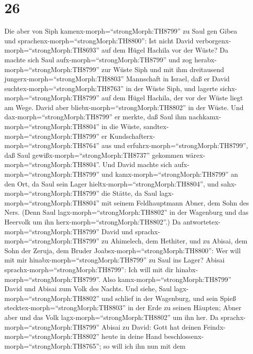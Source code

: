 \hypertarget{section-25}{%
\section{26}\label{section-25}}

 Die aber von Siph kamenx-morph=``strongMorph:TH8799'' zu
Saul gen Gibea und sprachenx-morph=``strongMorph:TH8800'': Ist nicht
David verborgenx-morph=``strongMorph:TH8693'' auf dem Hügel Hachila vor
der Wüste?  Da machte sich Saul
aufx-morph=``strongMorph:TH8799'' und zog
herabx-morph=``strongMorph:TH8799'' zur Wüste Siph und mit ihm
dreitausend jungerx-morph=``strongMorph:TH8803'' Mannschaft in Israel,
daß er David suchtex-morph=``strongMorph:TH8763'' in der Wüste Siph,
 und lagerte sichx-morph=``strongMorph:TH8799'' auf dem
Hügel Hachila, der vor der Wüste liegt am Wege. David aber
bliebx-morph=``strongMorph:TH8802'' in der Wüste. Und
dax-morph=``strongMorph:TH8799'' er merkte, daß Saul ihm
nachkamx-morph=``strongMorph:TH8804'' in die Wüste, 
sandtex-morph=``strongMorph:TH8799'' er
Kundschafterx-morph=``strongMorph:TH8764'' aus und
erfuhrx-morph=``strongMorph:TH8799'', daß Saul
gewißx-morph=``strongMorph:TH8737'' gekommen
wärex-morph=``strongMorph:TH8804''.  Und David machte sich
aufx-morph=``strongMorph:TH8799'' und kamx-morph=``strongMorph:TH8799''
an den Ort, da Saul sein Lager hieltx-morph=``strongMorph:TH8804'', und
sahx-morph=``strongMorph:TH8799'' die Stätte, da Saul
lagx-morph=``strongMorph:TH8804'' mit seinem Feldhauptmann Abner, dem
Sohn des Ners. (Denn Saul lagx-morph=``strongMorph:TH8802'' in der
Wagenburg und das Heervolk um ihn herx-morph=``strongMorph:TH8802''.)
 Da antwortetex-morph=``strongMorph:TH8799'' David und
sprachx-morph=``strongMorph:TH8799'' zu Ahimelech, dem Hethiter, und zu
Abisai, dem Sohn der Zeruja, dem Bruder
Joabsx-morph=``strongMorph:TH8800'': Wer will mit mir
hinabx-morph=``strongMorph:TH8799'' zu Saul ins Lager? Abisai
sprachx-morph=``strongMorph:TH8799'': Ich will mit dir
hinabx-morph=``strongMorph:TH8799''.  Also
kamx-morph=``strongMorph:TH8799'' David und Abisai zum Volk des Nachts.
Und siehe, Saul lagx-morph=``strongMorph:TH8802'' und schlief in der
Wagenburg, und sein Spieß stecktex-morph=``strongMorph:TH8803'' in der
Erde zu seinen Häupten; Abner aber und das Volk
lagx-morph=``strongMorph:TH8802'' um ihn her.  Da
sprachx-morph=``strongMorph:TH8799'' Abisai zu David: Gott hat deinen
Feindx-morph=``strongMorph:TH8802'' heute in deine Hand
beschlossenx-morph=``strongMorph:TH8765''; so will ich ihn nun mit dem
